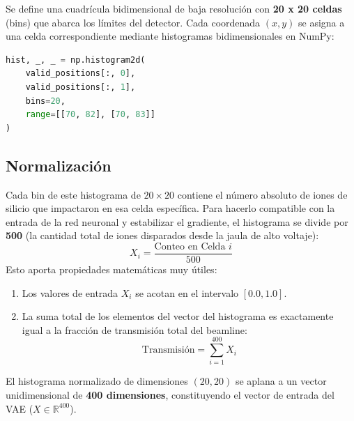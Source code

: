 \documentclass[12pt,letterpaper]{article}
\begin{document}
Se define una cuadrícula bidimensional de baja resolución con \textbf{20 x 20 celdas} (bins) que abarca los límites del detector. Cada coordenada $(x, y)$ se asigna a una celda correspondiente mediante histogramas bidimensionales en NumPy:
\begin{lstlisting}[language=Python]
hist, _, _ = np.histogram2d(
    valid_positions[:, 0], 
    valid_positions[:, 1], 
    bins=20, 
    range=[[70, 82], [70, 83]]
)
\end{lstlisting}

\subsection{Normalización}
Cada bin de este histograma de $20 \times 20$ contiene el número absoluto de iones de silicio que impactaron en esa celda específica. Para hacerlo compatible con la entrada de la red neuronal y estabilizar el gradiente, el histograma se divide por \textbf{500} (la cantidad total de iones disparados desde la jaula de alto voltaje):
\begin{equation}
    X_{i} = \frac{\text{Conteo en Celda } i}{500}
\end{equation}
Esto aporta propiedades matemáticas muy útiles:
\begin{enumerate}
    \item Los valores de entrada $X_{i}$ se acotan en el intervalo $[0.0, 1.0]$.
    \item La suma total de los elementos del vector del histograma es exactamente igual a la fracción de transmisión total del beamline:
    \begin{equation}
        \text{Transmisión} = \sum_{i=1}^{400} X_i
    \end{equation}
\end{enumerate}

El histograma normalizado de dimensiones $(20, 20)$ se aplana a un vector unidimensional de \textbf{400 dimensiones}, constituyendo el vector de entrada del VAE ($X \in \mathbb{R}^{400}$).
\end{document}
